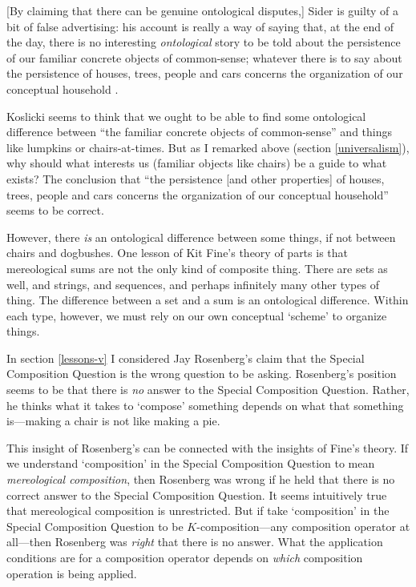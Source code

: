 \documentclass[11pt]{article}
\newenvironment{squote}{%
\begin{spacing}{1}
\begin{list}{}{%
\setlength{\labelwidth}{0pt}%
\rightmargin\leftmargin%
}
\item\relax
}{%
\end{list}%
\end{spacing}
}
\begin{document}
\begin{spacing}{1.5}
\begin{squote}
[By claiming that there can be genuine ontological disputes,] Sider is
guilty of a bit of false advertising: his account is really a way of
saying that, at the end of the day, there is no interesting {\em
  ontological} story to be told about the persistence of our familiar
concrete objects of common-sense; whatever there is to say about the
persistence of houses, trees, people and cars concerns the
organization of our conceptual household
\citeyearpar[124--125]{koslicki2003}.
\end{squote}

Koslicki seems to think that we ought to be able to find some
ontological difference between ``the familiar concrete objects of
common-sense'' and things like lumpkins or chairs-at-times.  But as I
remarked above (section \ref{universalism}), why should what interests
us (familiar objects like chairs) be a guide to what exists?  The
conclusion that ``the persistence [and other properties] of houses,
trees, people and cars concerns the organization of our conceptual
household'' seems to be correct.

However, there {\em is} an ontological difference between some things,
if not between chairs and dogbushes.  One lesson of Kit Fine's theory
of parts is that mereological sums are not the only kind of composite
thing.  There are sets as well, and strings, and sequences, and
perhaps infinitely many other types of thing.  The difference between
a set and a sum is an ontological difference.  Within each type,
however, we must rely on our own conceptual `scheme' to organize
things.

In section \ref{lessons-v} I considered Jay Rosenberg's claim that
the Special Composition Question is the wrong question to be asking.
Rosenberg's position seems to be that there is {\em no} answer to the
Special Composition Question.  Rather, he thinks what it takes to
`compose' something depends on what that something is---making a chair
is not like making a pie.

This insight of Rosenberg's can be connected with the insights of
Fine's theory.  If we understand `composition' in the Special
Composition Question to mean {\em mereological composition}, then
Rosenberg was wrong if he held that there is no correct answer to the
Special Composition Question.  It seems intuitively true that
mereological composition is unrestricted.  But if take `composition'
in the Special Composition Question to be $K$-composition---any
composition operator at all---then Rosenberg was {\em right} that
there is no answer.  What the application conditions are for a
composition operator depends on {\em which} composition operation is
being applied.  


\end{spacing}
\end{document}
